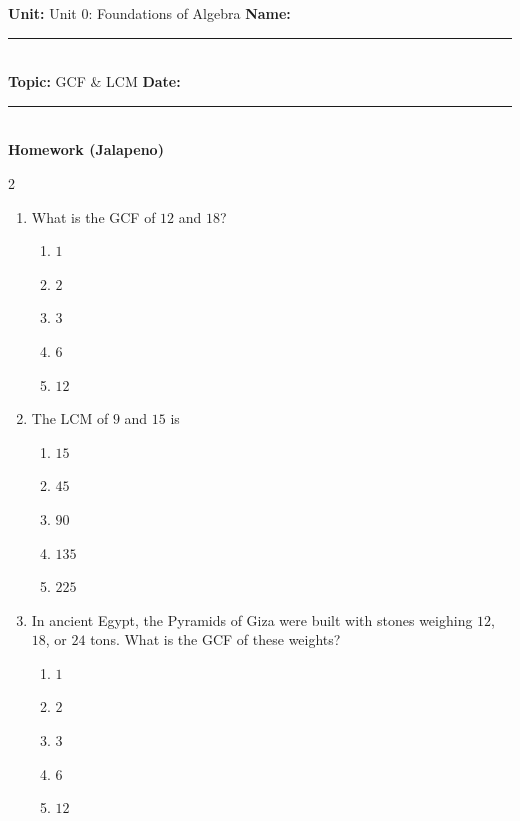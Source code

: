 \documentclass[10pt]{article}
\begin{document}
\enlargethispage{2.5cm}

\begin{tcolorbox}[colback=mainblue!5, colframe=mainblue, sharp corners, boxrule=0.5pt]
    \small \textbf{Unit:} Unit 0: Foundations of Algebra \hfill \textbf{Name:} \rule{3cm}{0.4pt} \\
    \small \textbf{Topic:} GCF & LCM \hfill \textbf{Date:} \rule{2cm}{0.4pt} \\
    \centering \textbf{\large Homework (Jalapeno)}
\end{tcolorbox}

\vspace{0.2cm}

\begin{multicols}{2}
\begin{enumerate}[label=\textbf{Q\arabic*.}, leftmargin=*, itemsep=6pt, parsep=0pt]

  \item \small What is the GCF of $12$ and $18$?
  \begin{enumerate}[label=(\Alph*), leftmargin=0.6cm, nosep, itemsep=2pt]
    \item $1$
    \item $2$
    \item $3$
    \item $6$
    \item $12$
  \end{enumerate}

  \item \small The LCM of $9$ and $15$ is
  \begin{enumerate}[label=(\Alph*), leftmargin=0.6cm, nosep, itemsep=2pt]
    \item $15$
    \item $45$
    \item $90$
    \item $135$
    \item $225$
  \end{enumerate}

  \item \small In ancient Egypt, the Pyramids of Giza were built with stones weighing $12$, $18$, or $24$ tons. What is the GCF of these weights?
  \begin{enumerate}[label=(\Alph*), leftmargin=0.6cm, nosep, itemsep=2pt]
    \item $1$
    \item $2$
    \item $3$
    \item $6$
    \item $12$
  \end{enumerate}


\end{enumerate}
\end{multicols}
\end{document}
